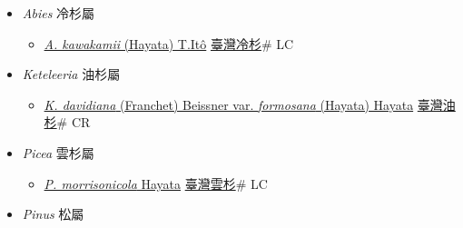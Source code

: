 
  \begin{itemize}
 \item[] \textit{Abies} 冷杉屬
                    
  \begin{itemize}
        \item[] \href{http://www.theplantlist.org/tpl1.1/search?q=Abies+kawakamii}{\textit{A. kawakamii} (Hayata) T.Itô}   \href{\detokenize{http://taibnet.sinica.edu.tw/chi/taibnet_species_list.php?T2=臺灣冷杉&T2_new_value=true&fr=y}}{臺灣冷杉}\# LC
  \end{itemize}
 \item[] \textit{Keteleeria} 油杉屬
                    
  \begin{itemize}
        \item[] \href{http://www.theplantlist.org/tpl1.1/search?q=Keteleeria+davidiana+var.+formosana}{\textit{K. davidiana} (Franchet) Beissner var. \textit{formosana} (Hayata) Hayata}   \href{\detokenize{http://taibnet.sinica.edu.tw/chi/taibnet_species_list.php?T2=臺灣油杉&T2_new_value=true&fr=y}}{臺灣油杉}\# CR
  \end{itemize}
 \item[] \textit{Picea} 雲杉屬
                    
  \begin{itemize}
        \item[] \href{http://www.theplantlist.org/tpl1.1/search?q=Picea+morrisonicola}{\textit{P. morrisonicola} Hayata}   \href{\detokenize{http://taibnet.sinica.edu.tw/chi/taibnet_species_list.php?T2=臺灣雲杉&T2_new_value=true&fr=y}}{臺灣雲杉}\# LC
  \end{itemize}
 \item[] \textit{Pinus} 松屬
                    

\end{itemize}
